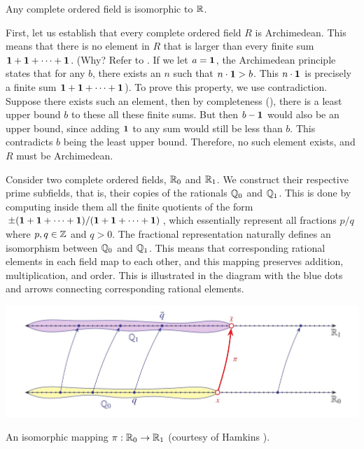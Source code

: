 \begin{theorem}[Uniqueness of $\RR$]
  Any complete ordered field is isomorphic to $\RR$.
\end{theorem}

\begin{proofsketch}
  First, let us establish that every complete ordered field $R$ is
  Archimedean. This means that there is no element in $R$ that is
  larger than every finite sum $\textbf{1} + \textbf{1} + \dots + \textbf{1}$. (Why?
    Refer to . If we let $a = \textbf{1}$, the
    Archimedean principle states that for any $b$, there exists an $n$
    such that $n \cdot \textbf{1} > b$. This $n \cdot \textbf{1}$ is precisely a
  finite sum $\textbf{1} + \textbf{1} + \dots + \textbf{1}$). To prove this property,
  we use contradiction. Suppose there exists such an element, then by
  completeness (), there is a least upper bound
  $b$ to these all these finite sums. But then $b - \textbf{1}$ would also
  be an upper bound, since adding $\textbf{1}$ to any sum would still be
  less than $b$. This contradicts $b$ being the least upper bound.
  Therefore, no such element exists, and $R$ must be Archimedean.

  Consider two complete ordered fields, $\mathbb R_0$ and $\mathbb R_1$. We
  construct their respective prime subfields, that is, their copies
  of the rationals $\mathbb Q_0$ and $\mathbb Q_1$. This is done by computing
  inside them all the finite quotients of the form $\pm(\textbf{1} + \textbf{1} +
  \dots + \textbf{1})/(\textbf{1} + \textbf{1} + \dots + \textbf{1})$, which essentially
  represent all fractions $p/q$ where $p, q \in \mathbb Z$ and $q > 0$. The
  fractional representation naturally defines an isomorphism between
  $\mathbb Q_0$ and $\mathbb Q_1$. This means that corresponding rational
  elements in each field map to each other, and this mapping
  preserves addition, multiplication, and order. This is illustrated
  in the diagram with the blue dots and arrows connecting
  corresponding rational elements.

  \begin{tightfigure}
    \centering
    \includegraphics[width=\textwidth]{media/uniqueness-of-the-reals.jpg}
    \vspace{-24pt}
    \caption{An isomorphic mapping $\pi : \mathbb R_0 \to \mathbb R_1$ (courtesy
    of Hamkins \cite{img:uniqueness-of-r}).}
  \end{tightfigure}


\end{proofsketch}
